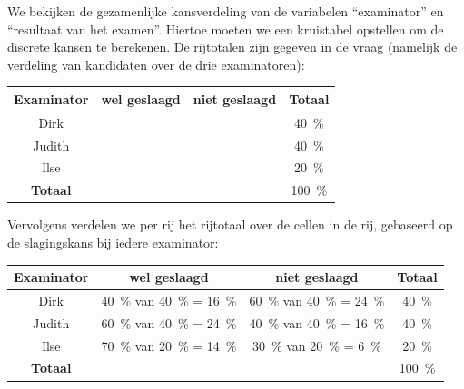 \begin{enumerate}[label=(\alph*)]
{        %
        We bekijken de gezamenlijke kansverdeling van de variabelen \enquote{examinator} en \enquote{resultaat van het examen}.
        Hiertoe moeten we een kruistabel opstellen om de discrete kansen te berekenen.
        De rijtotalen zijn gegeven in de vraag (namelijk de verdeling van kandidaten over de drie examinatoren):
        \begin{center}
            \begin{tabular}{c|cc|c}
                \toprule
                    Examinator & wel geslaagd & niet geslaagd & \textbf{Totaal}\\
                \midrule 
                    Dirk   & & & \SI{40}{\percent} \\
                    Judith & & & \SI{40}{\percent} \\
                    Ilse   & & & \SI{20}{\percent} \\
                \midrule
                    \textbf{Totaal} & & & \SI{100}{\percent} \\
                \bottomrule
            \end{tabular}
        \end{center}
        Vervolgens verdelen we per rij het rijtotaal over de cellen in de rij, gebaseerd op de slagingskans bij iedere examinator:
        \begin{center}
            \begin{tabular}{c|cc|c}
                \toprule
                    Examinator & wel geslaagd & niet geslaagd & \textbf{Totaal}\\
                \midrule 
                    Dirk   & \SI{40}{\percent} van \SI{40}{\percent} = \SI{16}{\percent} & \SI{60}{\percent} van \SI{40}{\percent} = \SI{24}{\percent} & \SI{40}{\percent} \\
                    Judith & \SI{60}{\percent} van \SI{40}{\percent} = \SI{24}{\percent} & \SI{40}{\percent} van \SI{40}{\percent} = \SI{16}{\percent} & \SI{40}{\percent} \\
                    Ilse   & \SI{70}{\percent} van \SI{20}{\percent} = \SI{14}{\percent} & \SI{30}{\percent} van \SI{20}{\percent} = \SI{6}{\percent} & \SI{20}{\percent} \\
                \midrule
                    \textbf{Totaal} & & & \SI{100}{\percent} \\
                \bottomrule
            \end{tabular}
        \end{center}
}
\end{enumerate}
